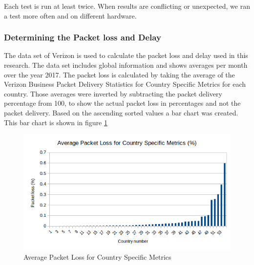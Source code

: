 \documentclass{article}
\begin{document}
Each test is run at least twice. When results are conflicting or unexpected, we
ran a test more often and on different hardware.



\subsubsection{Determining the Packet loss and Delay}

The data set of Verizon \cite{verizon-latency} is used to calculate the packet loss and delay used in this research. The data set includes global information and shows averages per month over the year 2017. The packet loss is calculated by taking the average of the Verizon Business Packet Delivery Statistics for Country Specific Metrics for each country. Those averages were inverted by subtracting the packet delivery percentage from 100, to show the actual packet loss in percentages and not the packet delivery. Based on the ascending sorted values a bar chart was created. This bar chart is shown in figure \ref{fig:packet-loss-chart}

\begin{figure}[H]
	\centering
		\includegraphics[scale=0.7]{figs/verizon-packetloss.png}
		\caption{Average Packet Loss for Country Specific Metrics}
	\label{fig:packet-loss-chart}
\end{figure}
\end{document}
